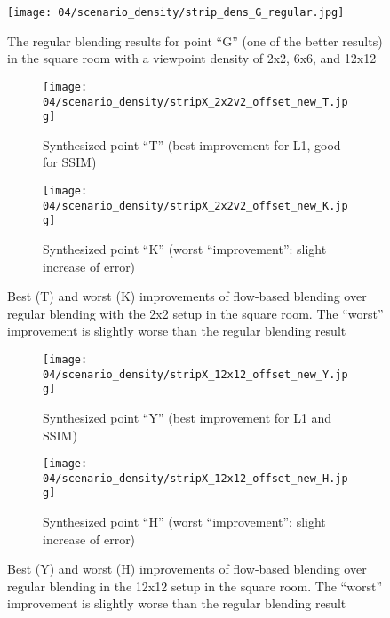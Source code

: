 \begin{figure}
		\centering
    \texttt{[image: 04/scenario\_density/strip\_dens\_G\_regular.jpg]}
		\caption{The regular blending results for point ``G'' (one of the better results) in the square room with a viewpoint density of 2x2, 6x6, and 12x12}
		\label{fig:density_regular_G}
\end{figure}

\begin{figure}
\centering
    \hfill
    \begin{subfigure}[b]{\textwidth}
            \centering
            \texttt{[image: 04/scenario\_density/stripX\_2x2v2\_offset\_new\_T.jpg]}
            \caption{Synthesized point ``T'' (best improvement for L1, good for SSIM)}
    \end{subfigure}
    \hfill

    \hfill
    \begin{subfigure}[b]{\textwidth}
            \centering
            \texttt{[image: 04/scenario\_density/stripX\_2x2v2\_offset\_new\_K.jpg]}
            \caption{Synthesized point ``K'' (worst ``improvement'': slight increase of error)}
    \end{subfigure}
    \hfill
  \caption[Best and worst improvements of flow-based blending over regular blending in the 2x2 setup]{Best (T) and worst (K) improvements of flow-based blending over regular blending with the 2x2 setup in the square room. The ``worst'' improvement is slightly worse than the regular blending result} \label{fig:density_2x2_best_worst}
\end{figure}

\begin{figure}
\centering
    \hfill
    \begin{subfigure}[b]{\textwidth}
            \centering
            \texttt{[image: 04/scenario\_density/stripX\_12x12\_offset\_new\_Y.jpg]}
            \caption{Synthesized point ``Y'' (best improvement for L1 and SSIM)}
    \end{subfigure}
    \hfill

    \hfill
    \begin{subfigure}[b]{\textwidth}
            \centering
            \texttt{[image: 04/scenario\_density/stripX\_12x12\_offset\_new\_H.jpg]}
            \caption{Synthesized point ``H'' (worst ``improvement'': slight increase of error)}
    \end{subfigure}
    \hfill
  \caption[Best and worst improvements of flow-based blending over regular blending with the 12x12 setup]{Best (Y) and worst (H) improvements of flow-based blending over regular blending in the 12x12 setup in the square room. The ``worst'' improvement is slightly worse than the regular blending result} \label{fig:density_12x12_best_worst}
\end{figure}

